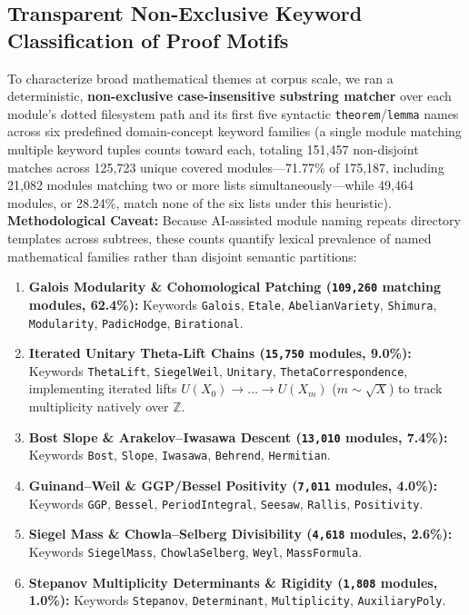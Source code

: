 \documentclass[11pt,a4paper]{article}
\begin{document}
\subsection{Transparent Non-Exclusive Keyword Classification of Proof Motifs}

To characterize broad mathematical themes at corpus scale, we ran a deterministic, \textbf{non-exclusive case-insensitive substring matcher} over each module's dotted filesystem path and its first five syntactic \texttt{theorem}/\texttt{lemma} names across six predefined domain-concept keyword families (a single module matching multiple keyword tuples counts toward each, totaling 151,457 non-disjoint matches across 125,723 unique covered modules---71.77\% of 175,187, including 21,082 modules matching two or more lists simultaneously---while 49,464 modules, or 28.24\%, match none of the six lists under this heuristic). \textbf{Methodological Caveat:} Because AI-assisted module naming repeats directory templates across subtrees, these counts quantify lexical prevalence of named mathematical families rather than disjoint semantic partitions:
\begin{enumerate}
  \item \textbf{Galois Modularity \& Cohomological Patching (\texttt{109,260} matching modules, 62.4\%):} Keywords \texttt{Galois}, \texttt{Etale}, \texttt{AbelianVariety}, \texttt{Shimura}, \texttt{Modularity}, \texttt{PadicHodge}, \texttt{Birational}.
  \item \textbf{Iterated Unitary Theta-Lift Chains (\texttt{15,750} modules, 9.0\%):} Keywords \texttt{ThetaLift}, \texttt{SiegelWeil}, \texttt{Unitary}, \texttt{ThetaCorrespondence}, implementing iterated lifts $U(X_0) \to \dots \to U(X_m)$ ($m \sim \sqrt{X}$) to track multiplicity natively over $\mathbb{Z}$.
  \item \textbf{Bost Slope \& Arakelov--Iwasawa Descent (\texttt{13,010} modules, 7.4\%):} Keywords \texttt{Bost}, \texttt{Slope}, \texttt{Iwasawa}, \texttt{Behrend}, \texttt{Hermitian}.
  \item \textbf{Guinand--Weil \& GGP/Bessel Positivity (\texttt{7,011} modules, 4.0\%):} Keywords \texttt{GGP}, \texttt{Bessel}, \texttt{PeriodIntegral}, \texttt{Seesaw}, \texttt{Rallis}, \texttt{Positivity}.
  \item \textbf{Siegel Mass \& Chowla--Selberg Divisibility (\texttt{4,618} modules, 2.6\%):} Keywords \texttt{SiegelMass}, \texttt{ChowlaSelberg}, \texttt{Weyl}, \texttt{MassFormula}.
  \item \textbf{Stepanov Multiplicity Determinants \& Rigidity (\texttt{1,808} modules, 1.0\%):} Keywords \texttt{Stepanov}, \texttt{Determinant}, \texttt{Multiplicity}, \texttt{AuxiliaryPoly}.
\end{enumerate}
\end{document}
